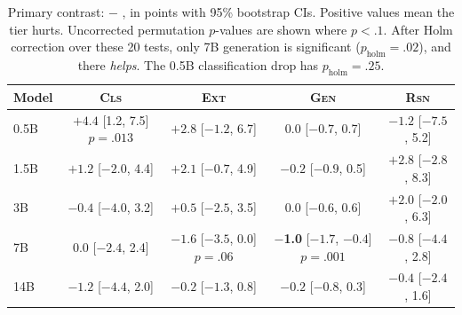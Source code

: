 \begin{table}[t]
\centering
\caption{Primary contrast: \standard $-$ \exhaustive, in points with 95\% bootstrap CIs. Positive values mean the \exhaustive tier hurts. Uncorrected permutation $p$-values are shown where $p<.1$. After Holm correction over these 20 tests, only 7B generation is significant ($p_{\text{holm}}=.02$), and there \exhaustive \emph{helps}. The 0.5B classification drop has $p_{\text{holm}}=.25$.}
\label{tab:drop}
\small
\begin{tabular}{@{}lcccc@{}}
\toprule
Model & \textsc{Cls} & \textsc{Ext} & \textsc{Gen} & \textsc{Rsn} \\
\midrule
0.5B & $+4.4$ {\scriptsize [1.2, 7.5]} $p{=}.013$ & $+2.8$ {\scriptsize [$-1.2$, 6.7]} & \phantom{$+$}$0.0$ {\scriptsize [$-0.7$, 0.7]} & $-1.2$ {\scriptsize [$-7.5$, 5.2]} \\
1.5B & $+1.2$ {\scriptsize [$-2.0$, 4.4]} & $+2.1$ {\scriptsize [$-0.7$, 4.9]} & $-0.2$ {\scriptsize [$-0.9$, 0.5]} & $+2.8$ {\scriptsize [$-2.8$, 8.3]} \\
3B   & $-0.4$ {\scriptsize [$-4.0$, 3.2]} & $+0.5$ {\scriptsize [$-2.5$, 3.5]} & \phantom{$+$}$0.0$ {\scriptsize [$-0.6$, 0.6]} & $+2.0$ {\scriptsize [$-2.0$, 6.3]} \\
7B   & \phantom{$+$}$0.0$ {\scriptsize [$-2.4$, 2.4]} & $-1.6$ {\scriptsize [$-3.5$, 0.0]} $p{=}.06$ & {\bf $-$1.0} {\scriptsize [$-1.7$, $-0.4$]} $p{=}.001$ & $-0.8$ {\scriptsize [$-4.4$, 2.8]} \\
14B  & $-1.2$ {\scriptsize [$-4.4$, 2.0]} & $-0.2$ {\scriptsize [$-1.3$, 0.8]} & $-0.2$ {\scriptsize [$-0.8$, 0.3]} & $-0.4$ {\scriptsize [$-2.4$, 1.6]} \\
\bottomrule
\end{tabular}
\end{table}
